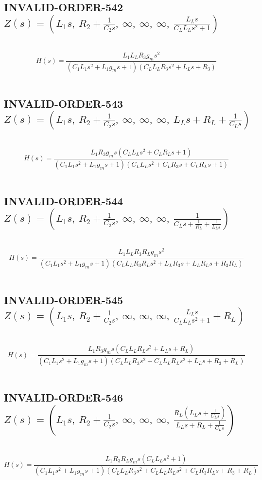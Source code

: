 \documentclass{article}
\begin{document}
\subsection{INVALID-ORDER-542 $Z(s) = \left( L_{1} s, \  R_{2} + \frac{1}{C_{2} s}, \  \infty, \  \infty, \  \infty, \  \frac{L_{L} s}{C_{L} L_{L} s^{2} + 1}\right)$ } \ 
\textbf{\[H(s) = \frac{L_{1} L_{L} R_{3} g_{m} s^{2}}{\left(C_{1} L_{1} s^{2} + L_{1} g_{m} s + 1\right) \left(C_{L} L_{L} R_{3} s^{2} + L_{L} s + R_{3}\right)}\] } \ 
\subsection{INVALID-ORDER-543 $Z(s) = \left( L_{1} s, \  R_{2} + \frac{1}{C_{2} s}, \  \infty, \  \infty, \  \infty, \  L_{L} s + R_{L} + \frac{1}{C_{L} s}\right)$ } \ 
\textbf{\[H(s) = \frac{L_{1} R_{3} g_{m} s \left(C_{L} L_{L} s^{2} + C_{L} R_{L} s + 1\right)}{\left(C_{1} L_{1} s^{2} + L_{1} g_{m} s + 1\right) \left(C_{L} L_{L} s^{2} + C_{L} R_{3} s + C_{L} R_{L} s + 1\right)}\] } \ 
\subsection{INVALID-ORDER-544 $Z(s) = \left( L_{1} s, \  R_{2} + \frac{1}{C_{2} s}, \  \infty, \  \infty, \  \infty, \  \frac{1}{C_{L} s + \frac{1}{R_{L}} + \frac{1}{L_{L} s}}\right)$ } \ 
\textbf{\[H(s) = \frac{L_{1} L_{L} R_{3} R_{L} g_{m} s^{2}}{\left(C_{1} L_{1} s^{2} + L_{1} g_{m} s + 1\right) \left(C_{L} L_{L} R_{3} R_{L} s^{2} + L_{L} R_{3} s + L_{L} R_{L} s + R_{3} R_{L}\right)}\] } \ 
\subsection{INVALID-ORDER-545 $Z(s) = \left( L_{1} s, \  R_{2} + \frac{1}{C_{2} s}, \  \infty, \  \infty, \  \infty, \  \frac{L_{L} s}{C_{L} L_{L} s^{2} + 1} + R_{L}\right)$ } \ 
\textbf{\[H(s) = \frac{L_{1} R_{3} g_{m} s \left(C_{L} L_{L} R_{L} s^{2} + L_{L} s + R_{L}\right)}{\left(C_{1} L_{1} s^{2} + L_{1} g_{m} s + 1\right) \left(C_{L} L_{L} R_{3} s^{2} + C_{L} L_{L} R_{L} s^{2} + L_{L} s + R_{3} + R_{L}\right)}\] } \ 
\subsection{INVALID-ORDER-546 $Z(s) = \left( L_{1} s, \  R_{2} + \frac{1}{C_{2} s}, \  \infty, \  \infty, \  \infty, \  \frac{R_{L} \left(L_{L} s + \frac{1}{C_{L} s}\right)}{L_{L} s + R_{L} + \frac{1}{C_{L} s}}\right)$ } \ 
\textbf{\[H(s) = \frac{L_{1} R_{3} R_{L} g_{m} s \left(C_{L} L_{L} s^{2} + 1\right)}{\left(C_{1} L_{1} s^{2} + L_{1} g_{m} s + 1\right) \left(C_{L} L_{L} R_{3} s^{2} + C_{L} L_{L} R_{L} s^{2} + C_{L} R_{3} R_{L} s + R_{3} + R_{L}\right)}\] } \ 
\end{document}
